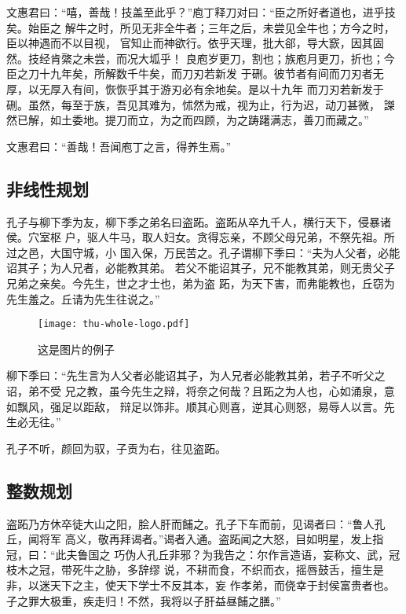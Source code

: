 \begin{translation}
文惠君曰：“嘻，善哉！技盖至此乎？”庖丁释刀对曰：“臣之所好者道也，进乎技矣。始臣之
解牛之时，所见无非全牛者；三年之后，未尝见全牛也；方今之时，臣以神遇而不以目视，
官知止而神欲行。依乎天理，批大郤，导大窾，因其固然。技经肯綮之未尝，而况大坬乎！
良庖岁更刀，割也；族庖月更刀，折也；今臣之刀十九年矣，所解数千牛矣，而刀刃若新发
于硎。彼节者有间而刀刃者无厚，以无厚入有间，恢恢乎其于游刃必有余地矣。是以十九年
而刀刃若新发于硎。虽然，每至于族，吾见其难为，怵然为戒，视为止，行为迟，动刀甚微，
謋然已解，如土委地。提刀而立，为之而四顾，为之踌躇满志，善刀而藏之。”

文惠君曰：“善哉！吾闻庖丁之言，得养生焉。”


\subsection{非线性规划}
孔子与柳下季为友，柳下季之弟名曰盗跖。盗跖从卒九千人，横行天下，侵暴诸侯。穴室枢
户，驱人牛马，取人妇女。贪得忘亲，不顾父母兄弟，不祭先祖。所过之邑，大国守城，小
国入保，万民苦之。孔子谓柳下季曰：“夫为人父者，必能诏其子；为人兄者，必能教其弟。
若父不能诏其子，兄不能教其弟，则无贵父子兄弟之亲矣。今先生，世之才士也，弟为盗
跖，为天下害，而弗能教也，丘窃为先生羞之。丘请为先生往说之。”
\begin{figure}[h]
  \centering
  \texttt{[image: thu-whole-logo.pdf]}
  \caption{这是图片的例子}
  \label{tab:badfigure3}
\end{figure}

柳下季曰：“先生言为人父者必能诏其子，为人兄者必能教其弟，若子不听父之诏，弟不受
兄之教，虽今先生之辩，将奈之何哉？且跖之为人也，心如涌泉，意如飘风，强足以距敌，
辩足以饰非。顺其心则喜，逆其心则怒，易辱人以言。先生必无往。”

孔子不听，颜回为驭，子贡为右，往见盗跖。

\subsection{整数规划}
盗跖乃方休卒徒大山之阳，脍人肝而餔之。孔子下车而前，见谒者曰：“鲁人孔丘，闻将军
高义，敬再拜谒者。”谒者入通。盗跖闻之大怒，目如明星，发上指冠，曰：“此夫鲁国之
巧伪人孔丘非邪？为我告之：尔作言造语，妄称文、武，冠枝木之冠，带死牛之胁，多辞缪
说，不耕而食，不织而衣，摇唇鼓舌，擅生是非，以迷天下之主，使天下学士不反其本，妄
作孝弟，而侥幸于封侯富贵者也。子之罪大极重，疾走归！不然，我将以子肝益昼餔之膳。”


\nocite{abrahams99tex,salomon1995advanced}






\end{translation}
